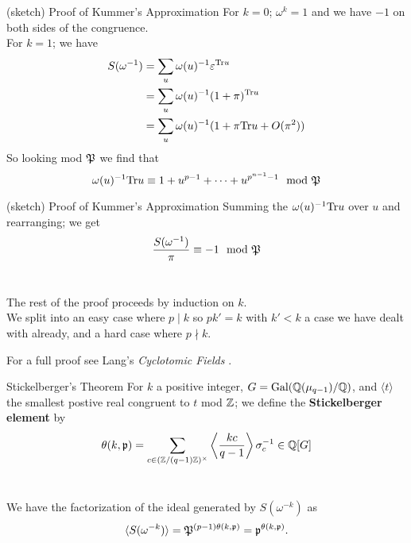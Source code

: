 \documentclass[presentation]{beamer}
\begin{document}
\begin{frame}{(sketch) Proof of Kummer's Approximation}
For $k =0$; $\omega^k = 1$ and we have $-1$ on both sides of the congruence.\\
\pause
\vspace{0.5cm}
For $k=1$; we have \begin{align*}
S(\omega^{-1}) &= \sum_u \omega(u)^{-1} \varepsilon^{\textrm{Tr} u} \\
&= \sum_u \omega(u)^{-1} (1 + \pi)^{\textrm{Tr} u} \\
&= \sum_u \omega(u)^{-1} ( 1 + \pi \textrm{Tr} u + O(\pi^2))
\end{align*}
\pause
\vspace{0.5cm}
So looking mod $\mathfrak{P}$ we find that \[\omega(u)^{-1} \textrm{Tr} u \equiv 1 + u^{p-1} + \cdots + u^{p^{n-1} -1} \mod {\mathfrak{P}}\]
\end{frame}

\begin{frame}{(sketch) Proof of Kummer's Approximation}
Summing the $\omega(u)^{-1} \textrm{Tr} u$ over $u$ and rearranging; we get \[ \frac{S(\omega^{-1})}{\pi} \equiv -1 \mod {\mathfrak{P}}\]\\
\pause
\vspace{0.5cm}

The rest of the proof proceeds by induction on $k$. 
\\
\pause
\vspace{0.5cm}
We split into an easy case where $p \mid k$ so $pk' = k$ with $k' < k$ a case we have dealt with already, and a hard case where $p \nmid k$.

For a full proof see Lang's \textit{Cyclotomic Fields} \cite{Lang1990}.

\end{frame}

\begin{frame}{Stickelberger's Theorem}
For  $k$ a positive integer, $G = \textrm{Gal}(\mathbb{Q}(\mu_{q-1})/\mathbb{Q})$, and $\langle t \rangle$ the smallest postive real congruent to $t$ mod $\mathbb{Z}$; we define the \textbf{Stickelberger element} by \[\theta(k,\mathfrak{p}) = \sum_{c \in (\mathbb{Z}/(q-1)\mathbb{Z})^\times} \left \langle \frac{kc}{q-1}\right \rangle \sigma_c^{-1} \in \mathbb{Q}[G]\]
\\
\pause
\vspace{0.5cm}
\begin{theorem}
We have the factorization of the ideal generated by $S(\omega^{-k})$ as \[\langle S(\omega^{-k})\rangle = \mathfrak{P}^{(p-1)\theta(k, \mathfrak{p})} = \mathfrak{p}^{\theta(k,\mathfrak{p})}.\]
\end{theorem}
\end{frame}
\end{document}
